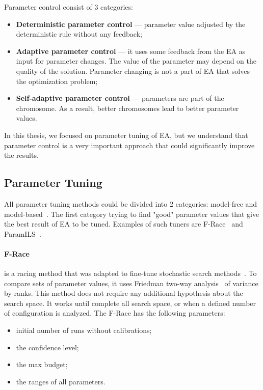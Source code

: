 Parameter control consist of 3 categories:
\begin{itemize}
	\item \textbf{Deterministic parameter control} — parameter value adjusted by the deterministic rule without any feedback;
	\item \textbf{Adaptive parameter control} — it uses some feedback from the EA as input for parameter changes. The value of the parameter may depend on the quality of the solution. Parameter changing is not a part of EA that solves the optimization problem;
	\item \textbf{Self-adaptive parameter control} — parameters are part of the chromosome. As a result, better chromosomes lead to better parameter values.
\end{itemize}
In this thesis, we focused on parameter tuning of EA, but we understand that parameter control is a very important approach that could significantly improve the results.

\subsection{Parameter Tuning}\label{sec:parameterTuning}
All parameter tuning methods could be divided into 2 categories: model-free and model-based~\cite{hutter2010}.
The first category trying to find "good" parameter values that give the best result of EA to be tuned. Examples of such tuners are F-Race~\cite{birattari2010f} and ParamILS~\cite{hutter2009paramils}.

\paragraph{F-Race} is a racing method that was adapted to fine-tune stochastic search methods~\cite{montero2012state}. To compare sets of parameter values, it uses Friedman two-way analysis~\cite{theodorsson87} of variance by ranks. This method does not require any additional hypothesis about the search space. It works until complete all search space, or when a defined number of configuration is analyzed. The F-Race has the following parameters:
\begin{itemize}
	\item initial number of runs without calibrations;
	\item the confidence level;
	\item the max budget;
	\item the ranges of all parameters.
\end{itemize}

